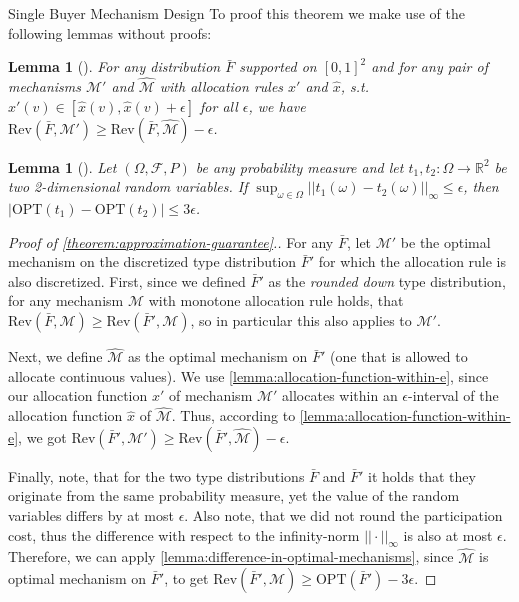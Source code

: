 \documentclass[11pt,a4paper]{article}
\newtheorem{lemma}[theorem]{Lemma}
\newcommand{\1}[1]{\mbox{\rm\bf 1}_{#1}}
\begin{document}
\begin{section}{Single Buyer Mechanism Design}
 To proof this theorem we make use of the following lemmas without proofs:

 \begin{lemma}[\citet{primary}]
     \label{lemma:allocation-function-within-e}
     For any distribution $\bar{F}$ supported on $[0,1]^2$ and for any pair of mechanisms $\mathcal{M}'$ and $\widehat{\mathcal{M}}$
     with allocation rules $x'$ and $\hat{x}$, s.t. $x'(v) \in [\hat{x}(v), \hat{x}(v) + \epsilon]$ for all $\epsilon$, we have $\mathrm{Rev}(\bar{F}, \mathcal{M}') \geq \mathrm{Rev}(\bar{F}, \widehat{\mathcal{M}}) - \epsilon$.
 \end{lemma}
 \begin{lemma}[\citet{primary}]
     \label{lemma:difference-in-optimal-mechanisms}
     Let $(\Omega, \mathcal{F}, P)$ be any probability measure and let $t_1, t_2: \Omega \rightarrow \mathbb{R}^2$ be two 2-dimensional random variables.
     If $\sup_{\omega \in \Omega} || t_1(\omega) - t_2(\omega) ||_\infty \leq \epsilon$, then $|\mathrm{OPT}(t_1) - \mathrm{OPT}(t_2)| \leq 3\epsilon$.
 \end{lemma}

 \begin{proof}[Proof of \autoref{theorem:approximation-guarantee}.]
     For any $\bar{F}$, let $\mathcal{M}'$ be the optimal mechanism on the discretized type distribution $\bar{F}'$ for which the allocation rule is also discretized.
     First, since we defined $\bar{F}'$ as the \textit{rounded down} type distribution, for any mechanism $\mathcal{M}$ with monotone allocation rule holds, that $\mathrm{Rev}(\bar{F}, \mathcal{M}) \geq \mathrm{Rev}(\bar{F}', \mathcal{M})$, so in particular this also applies to $\mathcal{M}'$.

     Next, we define $\widehat{\mathcal{M}}$ as the optimal mechanism on $\bar{F}'$ (one that is allowed to allocate continuous values).
     We use \autoref{lemma:allocation-function-within-e}, since our allocation function $x'$ of mechanism $\mathcal{M}'$
     allocates within an $\epsilon$-interval of the allocation function $\hat{x}$ of $\widehat{\mathcal{M}}$.
     Thus, according to \autoref{lemma:allocation-function-within-e}, we got $\mathrm{Rev}(\bar{F}', \mathcal{M}') \geq \mathrm{Rev}(\bar{F}', \widehat{\mathcal{M}}) - \epsilon$.

     Finally, note, that for the two type distributions $\bar{F}$ and $\bar{F}'$ it holds that they originate from the same probability measure, yet the value of the random variables differs by at most $\epsilon$.
     Also note, that we did not round the participation cost, thus the difference with respect to the infinity-norm $|| \cdot ||_{\infty}$ is also at most $\epsilon$.
     Therefore, we can apply \autoref{lemma:difference-in-optimal-mechanisms}, since $\widehat{\mathcal{M}}$ is optimal mechanism on $\bar{F}'$,
     to get $\mathrm{Rev}(\bar{F}', \widehat{\mathcal{M}}) \geq \mathrm{OPT}(\bar{F}') - 3\epsilon$.


\end{proof}
\end{section}
\end{document}
